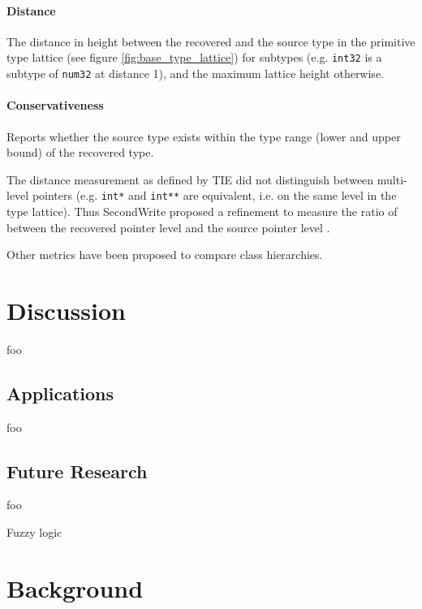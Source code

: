\documentclass[10pt, a4paper, sigplan, authordraft]{acmart}
\begin{document}
\paragraph{Distance} The distance in height between the recovered and the source type in the primitive type lattice (see figure \ref{fig:base_type_lattice}) for subtypes (e.g. \texttt{int32} is a subtype of \texttt{num32} at distance 1), and the maximum lattice height otherwise.

\paragraph{Conservativeness} Reports whether the source type exists within the type range (lower and upper bound) of the recovered type.

The distance measurement as defined by TIE did not distinguish between multi-level pointers (e.g. \texttt{int*} and \texttt{int**} are equivalent, i.e. on the same level in the type lattice). Thus SecondWrite proposed a refinement to measure the ratio of between the recovered pointer level and the source pointer level \cite{second_write_scalable_type_detection}.

Other metrics have been proposed to compare class hierarchies.


\section{Discussion}

foo

\subsection{Applications}

foo

\subsection{Future Research}

foo

Fuzzy logic



\section{Background}
\end{document}
